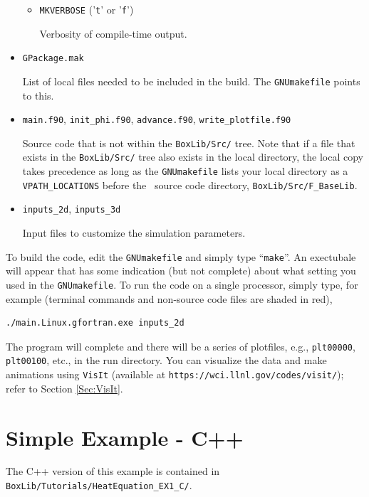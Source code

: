 \begin{itemize}
\begin{itemize}
    \item {\tt MKVERBOSE} ('{\tt t}' or '{\tt f}')

    Verbosity of compile-time output.

  \end{itemize}

\item {\tt GPackage.mak}

List of local files needed to be included in the build.  The {\tt GNUmakefile} points to this.

\item {\tt main.f90}, {\tt init\_phi.f90}, {\tt advance.f90}, {\tt write\_plotfile.f90}

Source code that is not within the {\tt BoxLib/Src/} tree.  Note that 
if a file that exists in the
{\tt BoxLib/Src/} tree also exists in the local directory, the local copy takes precedence
as long as the {\tt GNUmakefile} lists your local directory as a {\tt VPATH\_LOCATIONS} 
before the \BoxLib\ source code directory, {\tt BoxLib/Src/F\_BaseLib}.

\item {\tt inputs\_2d}, {\tt inputs\_3d}

Input files to customize the simulation parameters.

\end{itemize}

To build the code, edit the {\tt GNUmakefile} and simply type ``{\tt make}''.  An 
exectubale will appear that has some indication (but not complete)
about what setting you used in the {\tt GNUmakefile}.  To run the code on a single processor,
simply type, for example (terminal commands and non-source code files are shaded in red),
\begin{lstlisting}[backgroundcolor=\color{light-red}]
./main.Linux.gfortran.exe inputs_2d
\end{lstlisting}
The program will complete and there will be a series of plotfiles, e.g., {\tt plt00000}, 
{\tt plt00100}, etc., in the run directory.  You can visualize the data 
and make animations using {\tt VisIt} (available at {\tt https://wci.llnl.gov/codes/visit/});
refer to Section \ref{Sec:VisIt}.

\section{Simple Example - C++}
The C++ version of this example is contained in {\tt BoxLib/Tutorials/HeatEquation\_EX1\_C/}.

